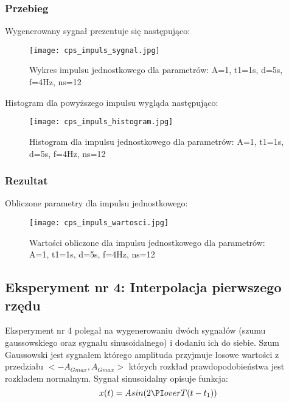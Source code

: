 \documentclass[12pt]{article}
\begin{document}
\subsubsection{Przebieg}
Wygenerowany sygnał prezentuje się następująco:
\begin{figure}[H]
    \centering
    \texttt{[image: cps\_impuls\_sygnal.jpg]}
    \caption{Wykres impulsu jednostkowego dla parametrów:  A=1, t1=1s, d=5s, f=4Hz, ns=12}
    \label{wykres dla eksperymentu 3}
\end{figure}

Histogram dla powyższego impulsu wygląda następująco:
\begin{figure}[H]
    \centering
    \texttt{[image: cps\_impuls\_histogram.jpg]}
    \caption{Histogram dla impulsu jednostkowego dla parametrów:  A=1, t1=1s, d=5s, f=4Hz, ns=12}
    \label{histogram dla eksperymentu 3}
\end{figure}


\subsubsection{Rezultat}
Obliczone parametry dla impulsu jednostkowego:
\begin{figure}[H]
    \centering
    \texttt{[image: cps\_impuls\_wartosci.jpg]}
    \caption{Wartości obliczone dla impulsu jednostkowego dla parametrów:  A=1, t1=1s, d=5s, f=4Hz, ns=12}
    \label{wartości dla eksperymentu 3}
\end{figure}



\newpage
\subsection{Eksperyment nr 4: Interpolacja pierwszego rzędu}

Eksperyment nr 4 polegał na wygenerowaniu dwóch sygnałów (szumu gaussowskiego oraz sygnału sinusoidalnego) i dodaniu ich do siebie. Szum Gaussowski jest sygnałem którego amplituda przyjmuje losowe wartości z przedziału $<-A_{Gmax},A_{Gmax}>$ których rozkład prawdopodobieństwa jest rozkładem normalnym. Sygnał sinusoidalny opisuje funkcja:
\begin{equation}
    x(t)=Asin({2\PI}over{T}(t-t_1))
\end{equation}
\end{document}
